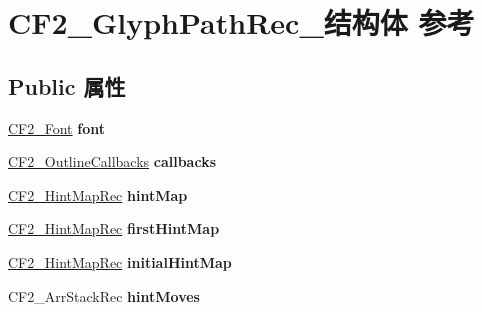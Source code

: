 \hypertarget{struct_c_f2___glyph_path_rec__}{}\section{C\+F2\+\_\+\+Glyph\+Path\+Rec\+\_\+结构体 参考}
\label{struct_c_f2___glyph_path_rec__}
\subsection*{Public 属性}
\begin{DoxyCompactItemize}
\item 
\mbox{\label{struct_c_f2___glyph_path_rec___a0dcf9d414ad0809f475bc6c28b86154c}} 
\hyperlink{struct_c_f2___font_rec__}{C\+F2\+\_\+\+Font} {\bfseries font}
\item 
\mbox{\label{struct_c_f2___glyph_path_rec___a27804e40a333084840cd789262a83a82}} 
\hyperlink{struct_c_f2___outline_callbacks_rec__}{C\+F2\+\_\+\+Outline\+Callbacks} {\bfseries callbacks}
\item 
\mbox{\label{struct_c_f2___glyph_path_rec___a2c9a8a7ff1bc5e342fea30a560b148a9}} 
\hyperlink{struct_c_f2___hint_map_rec__}{C\+F2\+\_\+\+Hint\+Map\+Rec} {\bfseries hint\+Map}
\item 
\mbox{\label{struct_c_f2___glyph_path_rec___a2363d4640599cd126bc14f7d4deb301e}} 
\hyperlink{struct_c_f2___hint_map_rec__}{C\+F2\+\_\+\+Hint\+Map\+Rec} {\bfseries first\+Hint\+Map}
\item 
\mbox{\label{struct_c_f2___glyph_path_rec___a6e225992a075e478bfc31c018270d03f}} 
\hyperlink{struct_c_f2___hint_map_rec__}{C\+F2\+\_\+\+Hint\+Map\+Rec} {\bfseries initial\+Hint\+Map}
\item 
\mbox{\label{struct_c_f2___glyph_path_rec___a10b3d1d6e5817f77590b42e75f58dfde}} 
C\+F2\+\_\+\+Arr\+Stack\+Rec {\bfseries hint\+Moves}
\item 
\mbox{\label{struct_c_f2___glyph_path_rec___a6dca16509862d89f0c204263048c72b7}} 

\end{DoxyCompactItemize}
